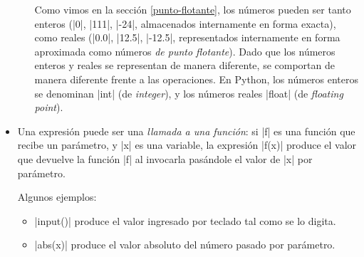 \begin{itemize}
\begin{itemize}
Como vimos en la sección \ref{punto-flotante}, los números pueden ser tanto
enteros (|0|, |111|, |-24|, almacenados internamente en forma exacta),
como reales (|0.0|, |12.5|, |-12.5|, representados internamente en
forma aproximada como números \emph{de punto flotante}). Dado que los
números enteros y reales se representan de manera diferente, se
comportan de manera diferente frente a las operaciones. En Python, los
números enteros se denominan |int| (de \emph{integer}), y los números
reales |float| (de \emph{floating point}).

\end{itemize}

\item Una expresión puede ser una \emph{llamada a una función}: si |f| es una
    función que recibe un parámetro, y |x| es una variable, la expresión |f(x)|
    produce el valor que devuelve la función |f| al invocarla pasándole el valor
    de |x| por parámetro.

    Algunos ejemplos:

\begin{itemize}
\item |input()| produce el valor ingresado por teclado tal como se lo digita.
\item |abs(x)| produce el valor absoluto del número pasado por parámetro.
\end{itemize}

\end{itemize}



